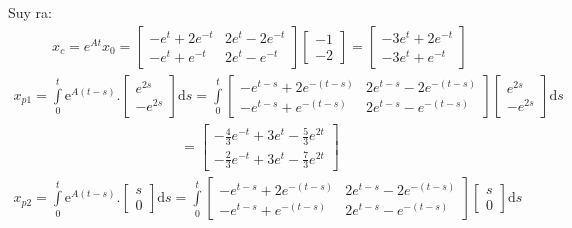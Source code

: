 Suy ra:\\
\begin{align*}
x_c=e^{At}x_0=
    \begin{bmatrix}
    -e^t+2e^{-t} & 2e^t-2e^{-t}\\
    -e^t+e^{-t} & 2e^t-e^{-t}
\end{bmatrix}
\begin{bmatrix}
    -1\\
    -2
\end{bmatrix}
=\begin{bmatrix}
    -3e^t+2e^{-t}\\
    -3e^t+e^{-t}
\end{bmatrix}
\end{align*}
\begin{align*}
    x_{p1}=\displaystyle\int\limits_{0}^{t} \mathrm{e}^{A(t-s)}.
    \begin{bmatrix}
        e^{2s}\\
        -e^{2s}
        \end{bmatrix}
    \mathrm{d}s
=\displaystyle\int\limits_{0}^{t}
\begin{bmatrix}
    -e^{t-s}+2e^{-(t-s)} & 2e^{t-s}-2e^{-(t-s)}\\
    -e^{t-s}+e^{-(t-s)} & 2e^{t-s}-e^{-(t-s)}
\end{bmatrix}
\begin{bmatrix}
        e^{2s}\\
        -e^{2s}
        \end{bmatrix}
\mathrm{d}s
\end{align*}
\begin{align*}
    =\begin{bmatrix}
    -\frac{4}{3}e^{-t}+3e^t-\frac{5}{3}e^{2t}\\
    -\frac{2}{3}e^{-t}+3e^t-\frac{7}{3}e^{2t}
\end{bmatrix}
\end{align*}
\begin{align*}
    x_{p2}=\displaystyle\int\limits_{0}^{t} \mathrm{e}^{A(t-s)}.
    \begin{bmatrix}
        s\\
        0
        \end{bmatrix}
    \mathrm{d}s
=\displaystyle\int\limits_{0}^{t}
\begin{bmatrix}
    -e^{t-s}+2e^{-(t-s)} & 2e^{t-s}-2e^{-(t-s)}\\
    -e^{t-s}+e^{-(t-s)} & 2e^{t-s}-e^{-(t-s)}
\end{bmatrix}
\begin{bmatrix}
        s\\
        0
        \end{bmatrix}
\mathrm{d}s
\end{align*}
